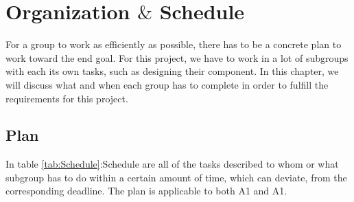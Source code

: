 \chapter{Organization $\&$ Schedule} 
For a group to work as efficiently as possible, there has to be a concrete plan to work toward the end goal. For this project, we have to work in a lot of subgroups with each its own tasks, such as designing their component. In this chapter, we will discuss what and when each group has to complete in order to fulfill the requirements for this project.\\

\section{Plan}
In table \ref{tab:Schedule}:Schedule are all of the tasks described to whom or what subgroup has to do within a certain amount of time, which can deviate, from the corresponding deadline. The plan is applicable to both A1 and A1.\\

